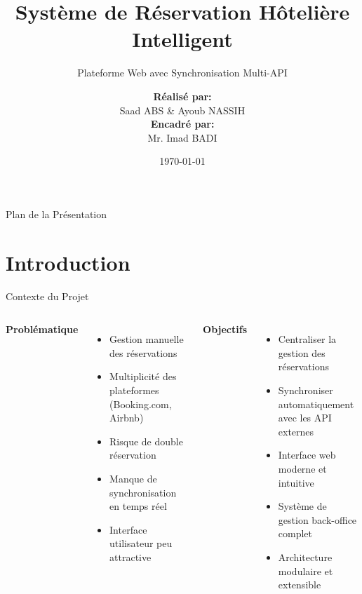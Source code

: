 \documentclass[aspectratio=169]{beamer}
\title[Système de Réservation Hôtelière]{Système de Réservation Hôtelière Intelligent}
\subtitle{Plateforme Web avec Synchronisation Multi-API}
\author[Saad ABS \& Ayoub NASSIH]{
    \textbf{Réalisé par:}\\
    Saad ABS \& Ayoub NASSIH\\[10pt]
    \textbf{Encadré par:}\\
    Mr. Imad BADI
}
\institute[ENSAH]{
    École Nationale des Sciences Appliquées\\
    Al Hoceima
}
\date{\today}
\begin{document}
\begin{frame}
    \titlepage
\end{frame}

\begin{frame}{Plan de la Présentation}
    \tableofcontents
\end{frame}

\section{Introduction}

\begin{frame}{Contexte du Projet}
    \begin{columns}
        \textbf{Problématique}
        \begin{itemize}
            \item Gestion manuelle des réservations
            \item Multiplicité des plateformes (Booking.com, Airbnb)
            \item Risque de double réservation
            \item Manque de synchronisation en temps réel
            \item Interface utilisateur peu attractive
        \end{itemize}
        
        \textbf{Objectifs}
        \begin{itemize}
            \item Centraliser la gestion des réservations
            \item Synchroniser automatiquement avec les API externes
            \item Interface web moderne et intuitive
            \item Système de gestion back-office complet
            \item Architecture modulaire et extensible
        \end{itemize}
    \end{columns}
\end{frame}
\end{document}
